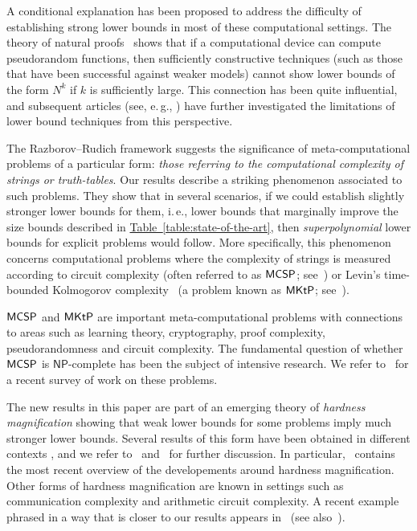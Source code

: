 \documentclass[11pt]{article}
\numberwithin{equation}{section}
\theoremstyle{definition}
\theoremstyle{plain}
\newcommand{\ie}{i.\,e.}
\newcommand{\eg}{e.\,g.}
\newcommand{\expref}[2]{\hyperref[#2]{#1~\ref{#2}}}
\newcommand{\MCSP}{\ensuremath{{\sf MCSP}}\xspace}
\newcommand{\MKtP}{\ensuremath{{\sf MKtP}}\xspace}
\begin{document}
A conditional explanation has been proposed to address the difficulty of establishing strong lower bounds in most of these computational settings. The theory of natural proofs~\cite{DBLP:journals/jcss/RazborovR97} shows that if a computational device can compute pseudorandom functions, then sufficiently constructive techniques (such as those that have been successful against weaker models) cannot show lower bounds of the form $N^k$ if $k$ is sufficiently large. This connection has been quite influential, and subsequent
%
articles   %
(see, \eg, \cite{DBLP:journals/jacm/MilesV15, Bogdanov18}) have 
further investigated the limitations of lower bound techniques from this 
perspective.  %

The Razborov--Rudich framework suggests the significance of meta-computational problems of a particular form: \emph{those referring to the computational complexity of strings or truth-tables}. Our results describe a striking phenomenon associated to such problems. They show that in several scenarios, if we could establish slightly stronger lower bounds for them, \ie, lower bounds that marginally improve the size bounds described in \expref{Table}{table:state-of-the-art}, then \emph{superpolynomial} lower bounds for explicit problems would follow. More specifically, this phenomenon concerns computational problems where the complexity of
strings %
is    %
measured according to circuit complexity (often referred to as \MCSP; see~\cite{DBLP:conf/stoc/KabanetsC00}) or Levin's time-bounded Kolmogorov complexity~\cite{Levin84} (a problem known as \MKtP; see~\cite{DBLP:journals/siamcomp/AllenderBKMR06}). 

\MCSP and \MKtP are important meta-computational problems with connections to areas such as learning theory, cryptography, proof complexity, pseudorandomness and circuit complexity. The fundamental question of whether \MCSP is $\mathsf{NP}$-complete has been the subject of  intensive research. We refer to~\cite{Allender20} for a %
recent survey of work on these problems.

The new results in this paper are part of an emerging theory of \emph{hardness magnification} showing that weak lower bounds for some problems imply much stronger lower bounds. Several results of this form have been obtained in different contexts \cite{DBLP:journals/jcss/Srinivasan03, DBLP:journals/jacm/AllenderK10, DBLP:journals/cc/LiptonW13, DBLP:journals/eccc/MullerP17, OS18}, and we refer to~\cite{OS18} and~\cite{chen_et_al:LIPIcs:2020:11755} for further discussion. In particular,~\cite{chen_et_al:LIPIcs:2020:11755} contains the most recent overview of the developements around hardness magnification. Other forms of hardness magnification are known in settings such as communication complexity and arithmetic circuit complexity. A recent example phrased in a way that is closer to our results appears in~\cite{CILM18} (see also~\cite{hrubevs2011non}).
\end{document}
